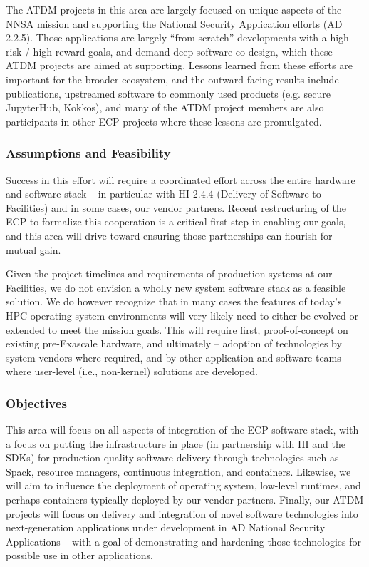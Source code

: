 The ATDM projects in this area are largely focused on unique aspects of the NNSA mission and supporting the National Security Application efforts (AD 2.2.5). Those applications are largely ``from scratch'' developments with a high-risk / high-reward goals, and demand deep software co-design, which these ATDM projects are aimed at supporting. Lessons learned from these efforts are important for the broader ecosystem, and the outward-facing results include publications, upstreamed software to commonly used products (e.g. secure JupyterHub, Kokkos), and many of the ATDM project members are also participants in other ECP projects where these lessons are promulgated. 

\subsubsection{Assumptions and Feasibility}
Success in this effort will require a coordinated effort across the entire hardware and software stack – in particular with HI 2.4.4 (Delivery of Software to Facilities) and in some cases, our vendor partners. Recent restructuring of the ECP to formalize this cooperation is a critical first step in enabling our goals, and this area will drive toward ensuring those partnerships can flourish for mutual gain.

Given the project timelines and requirements of production systems at our Facilities, we do not envision a wholly new system software stack as a feasible solution. We do however recognize that in many cases the features of today's HPC operating system environments will very likely need to either be evolved or extended to meet the mission goals. This will require first, proof-of-concept on existing pre-Exascale hardware, and ultimately – adoption of technologies by system vendors where required, and by other application and software teams where user-level (i.e., non-kernel) solutions are developed. 

\subsubsection{Objectives}
This area will focus on all aspects of integration of the ECP software stack, with a focus on putting the infrastructure in place (in partnership with HI and the SDKs) for production-quality software delivery through technologies such as Spack, resource managers, continuous integration, and containers. Likewise, we will aim to influence the deployment of operating system, low-level runtimes, and perhaps containers typically deployed by our vendor partners. Finally, our ATDM projects will focus on delivery and integration of novel software technologies into next-generation applications under development in AD National Security Applications – with a goal of demonstrating and hardening those technologies for possible use in other applications.


